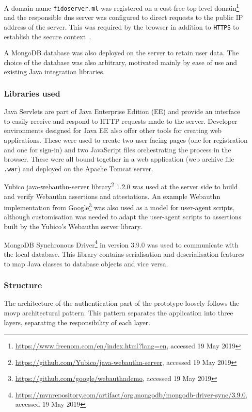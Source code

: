 A domain name \texttt{fidoserver.ml} was registered on a cost-free top-level domain\footnote{\url{https://www.freenom.com/en/index.html?lang=en}, accessed 19 May 2019} and the responsible \acrshort{dns} server was configured to direct requests to the public IP address of the server. This was required by the browser in addition to \texttt{HTTPS} to establish the secure context~\cite{Hodges2012HTTPHSTS}.

A MongoDB database was also deployed on the server to retain user data. The choice of the database was also arbitrary, motivated mainly by ease of use and existing Java integration libraries.

\subsubsection{Libraries used}
Java Servlets are part of Java Enterprise Edition (EE) and provide an interface to easily receive and respond to HTTP requests made to the server. Developer environments designed for Java EE also offer other tools for creating web applications. These were used to create two user-facing pages (one for registration and one for sign-in) and two JavaScript files orchestrating the process in the browser. These were all bound together in a web application (web archive file \texttt{.war}) and deployed on the Apache Tomcat server.

Yubico java-webauthn-server library\footnote{\url{https://github.com/Yubico/java-webauthn-server}, accessed 19 May 2019} 1.2.0 was used at the server side to build and verify Webauthn assertions and attestations. An example Webauthn implementation from Google\footnote{\url{https://github.com/google/webauthndemo}, accessed 19 May 2019} was also used as a model for user-agent scripts, although customisation was needed to adapt the user-agent scripts to assertions built by the Yubico's Webauthn server library.

MongoDB Synchronous Driver\footnote{\url{https://mvnrepository.com/artifact/org.mongodb/mongodb-driver-sync/3.9.0}, accessed 19 May 2019} in version 3.9.0 was used to communicate with the local database. This library contains serialisation and deserialisation features to map Java classes to database objects and vice versa.

\subsubsection{Structure}
The architecture of the authentication part of the prototype loosely follows the \acrlong{movp} architectural pattern. This pattern separates the application into three layers, separating the responsibility of each layer.


